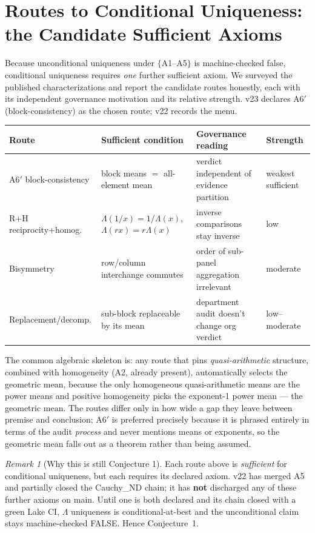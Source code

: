 \documentclass[11pt]{article}
\theoremstyle{plain}
\theoremstyle{definition}
\theoremstyle{remark}
\newtheorem{remark}[theorem]{Remark}
\newcommand{\La}{\Lambda}
\begin{document}
\section{Routes to Conditional Uniqueness: the Candidate Sufficient Axioms}

Because unconditional uniqueness under $\{$A1--A5$\}$ is machine-checked false,
conditional uniqueness requires \emph{one} further sufficient axiom. We surveyed the
published characterizations and report the candidate routes honestly, each with its
independent governance motivation and its relative strength. v23 declares A6$'$
(block-consistency) as the chosen route; v22 records the menu.

\begin{center}
\begin{tabular}{@{}p{3cm}p{4.5cm}p{4.5cm}l@{}}
\toprule
\textbf{Route} & \textbf{Sufficient condition} & \textbf{Governance reading} & \textbf{Strength} \\
\midrule
A6$'$ block-consistency & block means $=$ all-element mean & verdict independent of evidence partition & weakest sufficient \\
R+H reciprocity+homog. & $\La(1/x)=1/\La(x)$, $\La(rx)=r\La(x)$ & inverse comparisons stay inverse & low \\
Bisymmetry & row/column interchange commutes & order of sub-panel aggregation irrelevant & moderate \\
Replacement/decomp. & sub-block replaceable by its mean & department audit doesn't change org verdict & low--moderate \\
\bottomrule
\end{tabular}
\end{center}

The common algebraic skeleton is: any route that pins \emph{quasi-arithmetic}
structure, combined with homogeneity (A2, already present), automatically selects the
geometric mean, because the only homogeneous quasi-arithmetic means are the power
means and positive homogeneity picks the exponent-1 power mean --- the geometric
mean. The routes differ only in how wide a gap they leave between premise and
conclusion; A6$'$ is preferred precisely because it is phrased entirely in terms of
the audit \emph{process} and never mentions means or exponents, so the geometric mean
falls out as a theorem rather than being assumed.

\begin{remark}[Why this is still Conjecture 1]
Each route above is \emph{sufficient} for conditional uniqueness, but each requires
its declared axiom. v22 has merged A5 and partially closed the Cauchy\_ND chain; it
has \textbf{not} discharged any of these further axioms on main. Until one is both
declared and its chain closed with a green Lake CI, $\La$ uniqueness is
conditional-at-best and the unconditional claim stays machine-checked FALSE. Hence
Conjecture~1.
\end{remark}
\end{document}
